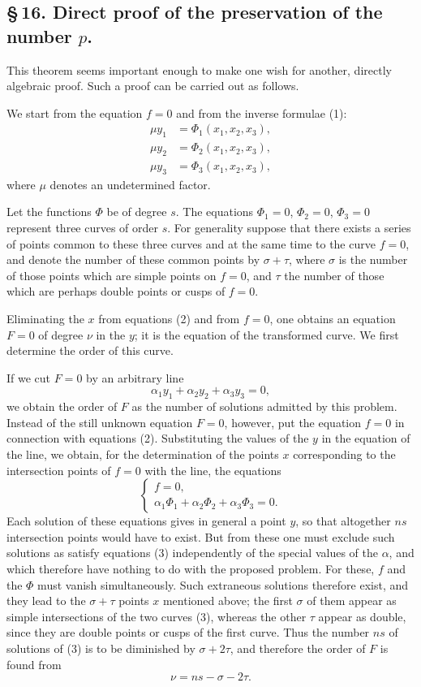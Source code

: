 \documentclass[10pt]{article}
\begin{document}
\subsection*{\S\,16. Direct proof of the preservation of the number \(p\).}

This theorem seems important enough to make one wish for another, directly algebraic proof. Such a proof can be carried out as follows.

We start from the equation \(f=0\) and from the inverse formulae (1):
\[
\tag{2}
\begin{aligned}
\mu y_1&=\Phi_1(x_1,x_2,x_3),\\
\mu y_2&=\Phi_2(x_1,x_2,x_3),\\
\mu y_3&=\Phi_3(x_1,x_2,x_3),
\end{aligned}
\]
where \(\mu\) denotes an undetermined factor.

Let the functions \(\Phi\) be of degree \(s\). The equations \(\Phi_1=0\), \(\Phi_2=0\), \(\Phi_3=0\) represent three curves of order \(s\). For generality suppose that there exists a series of points common to these three curves and at the same time to the curve \(f=0\), and denote the number of these common points by \(\sigma+\tau\), where \(\sigma\) is the number of those points which are simple points on \(f=0\), and \(\tau\) the number of those which are perhaps double points or cusps of \(f=0\).

Eliminating the \(x\) from equations (2) and from \(f=0\), one obtains an equation \(F=0\) of degree \(\nu\) in the \(y\); it is the equation of the transformed curve. We first determine the order of this curve.

If we cut \(F=0\) by an arbitrary line
\[
\alpha_1y_1+\alpha_2y_2+\alpha_3y_3=0,
\]
we obtain the order of \(F\) as the number of solutions admitted by this problem. Instead of the still unknown equation \(F=0\), however, put the equation \(f=0\) in connection with equations (2). Substituting the values of the \(y\) in the equation of the line, we obtain, for the determination of the points \(x\) corresponding to the intersection points of \(f=0\) with the line, the equations
\[
\tag{3}
\begin{cases}
f=0,\\
\alpha_1\Phi_1+\alpha_2\Phi_2+\alpha_3\Phi_3=0.
\end{cases}
\]
Each solution of these equations gives in general a point \(y\), so that altogether \(ns\) intersection points would have to exist. But from these one must exclude such solutions as satisfy equations (3) independently of the special values of the \(\alpha\), and which therefore have nothing to do with the proposed problem. For these, \(f\) and the \(\Phi\) must vanish simultaneously. Such extraneous solutions therefore exist, and they lead to the \(\sigma+\tau\) points \(x\) mentioned above; the first \(\sigma\) of them appear as simple intersections of the two curves (3), whereas the other \(\tau\) appear as double, since they are double points or cusps of the first curve. Thus the number \(ns\) of solutions of (3) is to be diminished by \(\sigma+2\tau\), and therefore the order of \(F\) is found from
\[
\nu=ns-\sigma-2\tau.
\]
\end{document}
